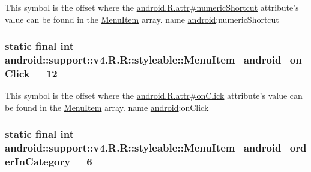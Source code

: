 This symbol is the offset where the \hyperlink{}{android.R.attr\#numericShortcut} attribute's value can be found in the \hyperlink{classandroid_1_1support_1_1v4_1_1_r_1_1styleable_05493a7eeaa2bff09c4fbacbfb671ccc}{MenuItem} array.  name \hyperlink{namespaceandroid}{android}:numericShortcut \hypertarget{classandroid_1_1support_1_1v4_1_1_r_1_1styleable_fa40cc2323bbb032c868308d16e7d64e}{
\subsubsection[{MenuItem\_\-android\_\-onClick}]{\setlength{\rightskip}{0pt plus 5cm}static final int android::support::v4.R.R::styleable::MenuItem\_\-android\_\-onClick = 12}}
\label{classandroid_1_1support_1_1v4_1_1_r_1_1styleable_fa40cc2323bbb032c868308d16e7d64e}


This symbol is the offset where the \hyperlink{}{android.R.attr\#onClick} attribute's value can be found in the \hyperlink{classandroid_1_1support_1_1v4_1_1_r_1_1styleable_05493a7eeaa2bff09c4fbacbfb671ccc}{MenuItem} array.  name \hyperlink{namespaceandroid}{android}:onClick \hypertarget{classandroid_1_1support_1_1v4_1_1_r_1_1styleable_7976bdeaae19ffc9069033a5afb3458f}{
\subsubsection[{MenuItem\_\-android\_\-orderInCategory}]{\setlength{\rightskip}{0pt plus 5cm}static final int android::support::v4.R.R::styleable::MenuItem\_\-android\_\-orderInCategory = 6}}
\label{classandroid_1_1support_1_1v4_1_1_r_1_1styleable_7976bdeaae19ffc9069033a5afb3458f}


